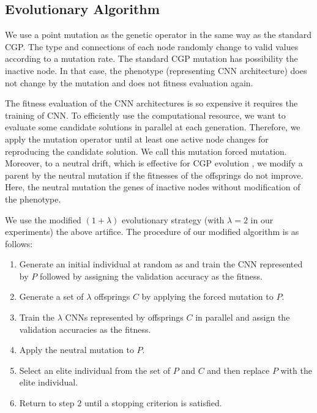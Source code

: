 \subsection{Evolutionary Algorithm}
We use a point mutation as the genetic operator in the same way as the standard CGP. The type and connections of each node randomly change to valid values according to a mutation rate. 
The standard CGP mutation has  possibility  the inactive node. In that case, the phenotype (representing  CNN architecture) does not change by the mutation and does not  fitness evaluation again.

The fitness evaluation of the CNN architectures is so expensive  it requires the training of CNN.
To efficiently use the computational resource, we want to evaluate some candidate solutions in parallel at each generation.
Therefore, we apply the mutation operator until at least one active node changes for reproducing the candidate solution. We call this mutation  forced mutation.
Moreover, to  a neutral drift, which is effective for CGP evolution \cite{miller_redundancy_2006,miller_cartesian_2000}, we modify a parent by the neutral mutation if the fitnesses of the offsprings do not improve.
Here, the neutral mutation   the genes of  inactive nodes without  modification of the phenotype.

We use the modified $(1+\lambda)$ evolutionary strategy (with $\lambda = 2$ in our experiments)  the above artifice.
The procedure of our modified algorithm is as follows:
\begin{enumerate}
  \item Generate an initial individual at random as  and train the CNN represented by $P$ followed by assigning the validation accuracy as the fitness.
  \item Generate a set of $\lambda$ offsprings $C$ by applying the forced mutation to $P$.
  \item Train the $\lambda$ CNNs represented by offsprings $C$ in parallel\new{,} and assign the validation accuracies as the fitness.
  \item Apply the neutral mutation to  $P$.
  \item Select an elite individual from the set of $P$ and $C$\new{,} and then replace $P$ with the elite individual.
  \item Return to step $2$ until a stopping criterion is satisfied.
\end{enumerate}


